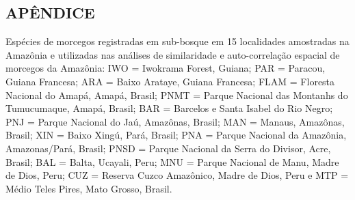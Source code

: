 \begin{multicols}{2}
\section*{APÊNDICE}
\par{}Espécies de morcegos registradas em sub-\allowbreak{}bosque em 15 localidades amostradas na Amazônia e utilizadas nas análises de similaridade e auto-\allowbreak{}correlação espacial de morcegos da Amazônia:\allowbreak{} IWO = Iwokrama Forest,\allowbreak{} Guiana; PAR = Paracou,\allowbreak{} Guiana Francesa; ARA = Baixo Arataye,\allowbreak{} Guiana Francesa; FLAM = Floresta Nacional do Amapá,\allowbreak{} Amapá,\allowbreak{} Brasil; PNMT = Parque Nacional das Montanhs do Tumucumaque,\allowbreak{} Amapá,\allowbreak{} Brasil; BAR = Barcelos e Santa Isabel do Rio Negro; PNJ = Parque Nacional do Jaú,\allowbreak{} Amazônas,\allowbreak{} Brasil; MAN = Manaus,\allowbreak{} Amazônas,\allowbreak{} Brasil; XIN = Baixo Xingú,\allowbreak{} Pará,\allowbreak{} Brasil; PNA = Parque Nacional da Amazônia,\allowbreak{} Amazonas\fshyp{}Pará,\allowbreak{} Brasil; PNSD = Parque Nacional da Serra do Divisor,\allowbreak{} Acre,\allowbreak{} Brasil; BAL = Balta,\allowbreak{} Ucayali,\allowbreak{} Peru; MNU = Parque Nacional de Manu,\allowbreak{} Madre de Dios,\allowbreak{} Peru; CUZ = Reserva Cuzco Amazônico,\allowbreak{} Madre de Dios,\allowbreak{} Peru e MTP = Médio Teles Pires,\allowbreak{} Mato Grosso,\allowbreak{} Brasil.\allowbreak{}

\begin{biblio}[REFERENCES]





\end{biblio}
\end{multicols}
